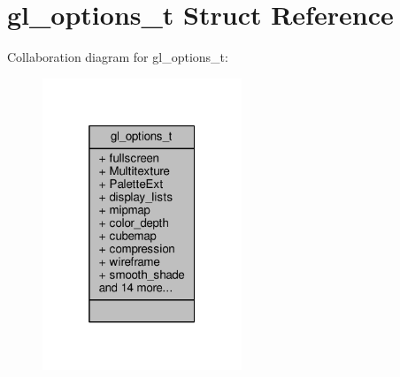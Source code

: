 \hypertarget{structgl__options__t}{}\section{gl\+\_\+options\+\_\+t Struct Reference}
\label{structgl__options__t}


Collaboration diagram for gl\+\_\+options\+\_\+t\+:
\nopagebreak
\begin{figure}[H]
\begin{center}
\leavevmode
\includegraphics[width=169pt]{d8/d22/structgl__options__t__coll__graph}
\end{center}
\end{figure}

